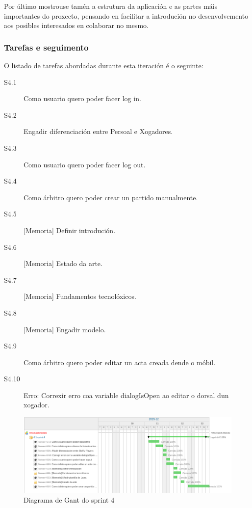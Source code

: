       Por último mostrouse tamén a estrutura da aplicación e as partes máis 
importantes do proxecto, pensando en facilitar a introdución no 
desenvolvemento aos posibles interesados en colaborar no mesmo.

      \subsubsection{Tarefas e seguimento}

      O listado de tarefas abordadas durante esta iteración é o seguinte:

        \begin{description}
          \item [S4.1] Como usuario quero poder facer log in.
          \item [S4.2] Engadir diferenciación entre Persoal e Xogadores.
          \item [S4.3] Como usuario quero poder facer log out.
          \item [S4.4] Como árbitro quero poder crear un partido manualmente.
          \item [S4.5] [Memoria] Definir introdución.
          \item [S4.6] [Memoria] Estado da arte.
          \item [S4.7] [Memoria] Fundamentos tecnolóxicos.
          \item [S4.8] [Memoria] Engadir modelo.
          \item [S4.9] Como árbitro quero poder editar un acta creada dende o 
móbil.
          \item [S4.10] Erro: Correxir erro coa variable dialogIsOpen ao editar 
o dorsal dun xogador.
        \end{description}

        \begin{figure}[h!]
          \begin{center}
          \includegraphics[width=\textwidth]{./img/gant_diagrams/04.png}
          \caption{Diagrama de Gant do sprint 4}
          \label{fig:gant04}
          \end{center}
        \end{figure}

